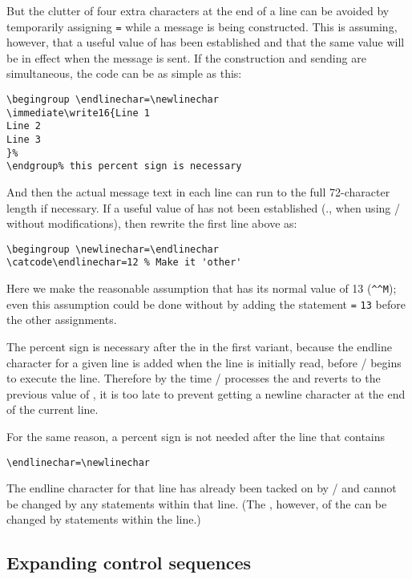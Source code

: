 {But the clutter of four extra characters at the end of a line can be
avoided by temporarily assigning  \verb;=;
 while a message is being constructed. This is
assuming, however, that a useful value of  has been
established and that the same value will be in effect when the
message is sent. If the construction and sending are simultaneous,
the code can be as simple as this:
 \begin{verbatim}
\begingroup \endlinechar=\newlinechar
\immediate\write16{Line 1
Line 2
Line 3
}%
\endgroup% this percent sign is necessary
\end{verbatim}
 And then the actual message text in each line
can run to the full 72-character length if necessary.
If a useful value of  has not been established
(\eg., when using \plaintex/ without modifications), then
rewrite the first line above as:
\begin{verbatim}
\begingroup \newlinechar=\endlinechar
\catcode\endlinechar=12 % Make it 'other'
\end{verbatim}
Here we make the reasonable
assumption that  has its normal value
of 13 (\verb;^^M;); even this assumption could
be done without by adding the statement  \verb;=;
\verb;13; before the other assignments.

The percent sign is necessary after the  in the first
variant, because the endline character for a given line is added when
the line is initially read, before \tex/ begins to execute the line.
Therefore by the time \tex/ processes the  and reverts
to the previous value of , it is too late to prevent
getting a newline character at the end of the current line.

For the same reason, a percent sign is not needed
after the line that contains
\begin{verbatim}
\endlinechar=\newlinechar
\end{verbatim}
The endline character for that line has already been tacked on
by \tex/ and cannot be changed by any statements within that line.
(The , however,
of the  can be changed by statements within the line.)

\subsection{Expanding control sequences}\label{s:excs}

}
